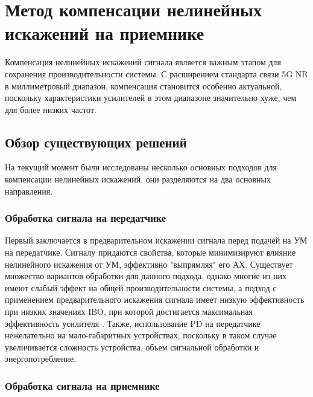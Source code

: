 \section{Метод компенсации нелинейных искажений на приемнике}
Компенсация нелинейных искажений сигнала является важным этапом для
сохранения производительности системы. С расширением стандарта связи 5G NR
в миллиметровый диапазон, компенсация становится особенно актуальной,
поскольку характеристики усилителей в этом диапазоне значительно хуже, чем
для более низких частот.

\subsection{Обзор существующих решений}
На текущий момент были исследованы несколько основных подходов для
компенсации нелинейных искажений, они разделяются на два основных
направления.

\subsubsection{Обработка сигнала на передатчике}

Первый заключается в предварительном искажении сигнала перед
подачей на УМ на передатчике. Сигналу придаются свойства, которые
минимизируют влияние нелинейного искажения от УМ, эффективно "выпрямляя"
его АХ. Существует множество вариантов обработки для данного подхода,
однако многие из них имеют слабый эффект на общей производительности
системы, а подход с применением предварительного искажения сигнала имеет
низкую эффективность при низких значениях IBO, при которой достигается
максимальная эффективность усилителя \cite{sharath2015}
\cite{shabany2008} \cite{eda2001}. Также, использование PD на передатчике
нежелательно на мало-габаритных устройствах, поскольку в таком случае
увеличивается сложность устройства, объем сигнальной обработки и энергопотребление.

\subsubsection{Обработка сигнала на приемнике}

